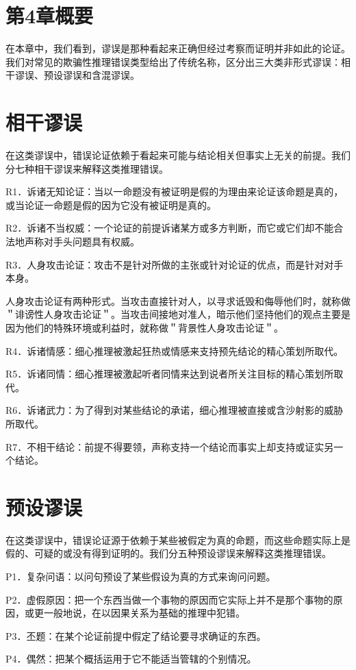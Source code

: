 \section*{第4章概要}
在本章中，我们看到，谬误是那种看起来正确但经过考察而证明并非如此的论证。我们对常见的欺骗性推理错误类型给出了传统名称，区分出三大类非形式谬误：相干谬误、预设谬误和含混谬误。

\section*{相干谬误}
在这类谬误中，错误论证依赖于看起来可能与结论相关但事实上无关的前提。我们分七种相干谬误来解释这类推理错误。

R1．诉诸无知论证：当以一命题没有被证明是假的为理由来论证该命题是真的，或当论证一命题是假的因为它没有被证明是真的。

R2．诉诸不当权威：一个论证的前提诉诸某方或多方判断，而它或它们却不能合法地声称对手头问题具有权威。

R3．人身攻击论证：攻击不是针对所做的主张或针对论证的优点，而是针对对手本身。

人身攻击论证有两种形式。当攻击直接针对人，以寻求诋毁和侮辱他们时，就称做＂诽谤性人身攻击论证＂。当攻击间接地对准人，暗示他们坚持他们的观点主要是因为他们的特殊环境或利益时，就称做＂背景性人身攻击论证＂。

R4．诉诸情感：细心推理被激起狂热或情感来支持预先结论的精心策划所取代。

R5．诉诸同情：细心推理被激起听者同情来达到说者所关注目标的精心策划所取代。

R6．诉诸武力：为了得到对某些结论的承诺，细心推理被直接或含沙射影的威胁所取代。

R7．不相干结论：前提不得要领，声称支持一个结论而事实上却支持或证实另一个结论。

\section*{预设谬误}
在这类谬误中，错误论证源于依赖于某些被假定为真的命题，而这些命题实际上是假的、可疑的或没有得到证明的。我们分五种预设谬误来解释这类推理错误。

P1．复杂问语：以问句预设了某些假设为真的方式来询问问题。

P2．虚假原因：把一个东西当做一个事物的原因而它实际上并不是那个事物的原因，或更一般地说，在以因果关系为基础的推理中犯错。

P3．丕题：在某个论证前提中假定了结论要寻求确证的东西。

P4．偶然：把某个概括运用于它不能适当管辖的个别情况。

